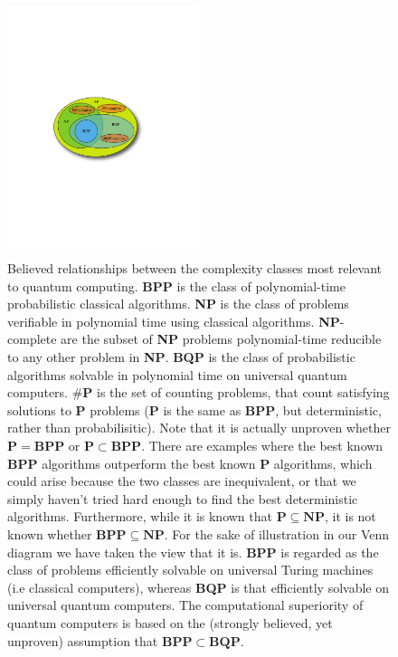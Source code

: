 \begin{figure}[!htb]
	\includegraphics[width=0.5\textwidth]{complexity_classes}    
	\caption{Believed relationships between the complexity classes most relevant to quantum computing. \textbf{BPP} is the class of polynomial-time probabilistic classical algorithms. \textbf{NP} is the class of problems verifiable in polynomial time using classical algorithms. \textbf{NP}-complete are the subset of \textbf{NP} problems polynomial-time reducible to any other problem in \textbf{NP}. \textbf{BQP} is the class of probabilistic algorithms solvable in polynomial time on universal quantum computers. $\#\mathbf{P}$ is the set of counting problems, that count satisfying solutions to \textbf{P} problems (\textbf{P} is the same as \textbf{BPP}, but deterministic, rather than probabilisitic). Note that it is actually unproven whether \mbox{$\mathbf{P}=\mathbf{BPP}$} or \mbox{$\mathbf{P}\subset\mathbf{BPP}$}. There are examples where the best known \textbf{BPP} algorithms outperform the best known \textbf{P} algorithms, which could arise because the two classes are inequivalent, or that we simply haven't tried hard enough to find the best deterministic algorithms. Furthermore, while it is known that \mbox{$\mathbf{P}\subseteq\mathbf{NP}$}, it is not known whether \mbox{$\mathbf{BPP}\subseteq\mathbf{NP}$}. For the sake of illustration in our Venn diagram we have taken the view that it is. \textbf{BPP} is regarded as the class of problems efficiently solvable on universal Turing machines (i.e classical computers), whereas \textbf{BQP} is that efficiently solvable on universal quantum computers. The computational superiority of quantum computers is based on the (strongly believed, yet unproven) assumption that \mbox{$\mathbf{BPP}\subset\mathbf{BQP}$}.} \label{fig:complexity_classes}
\end{figure}

